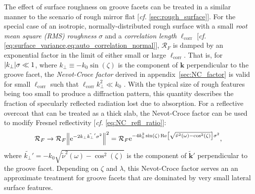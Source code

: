 The effect of surface roughness on groove facets can be treated in a similar manner to the scenario of rough mirror flat [\emph{cf.\@} \cref{sec:rough_surface}]. %
For the special case of an isotropic, normally-distributed rough surface with a small \emph{root mean square (RMS) roughness} $\sigma$ and a \emph{correlation length} $\ell_{\text{corr}}$ [\emph{cf.\@} \cref{eq:surface_variance,eq:auto_correlation_normal}], $\mathcal{R}_F$ is damped by an exponential factor in the limit of either small or large $\ell_{\text{corr}}$. 
That is, for $\abs{k_{\perp}} \sigma \ll 1$, where $k_{\perp} \equiv - k_0 \sin \left( \zeta \right)$ is the component of $\mathbold{k}$ perpendicular to the groove facet, the \emph{Nevot-Croce factor} derived in appendix~\ref{sec:NC_factor} is valid for small $\ell_{\text{corr}}$ such that $\ell_{\text{corr}} k_{\perp}^2 \ll k_0$ \cite{deBoer95}. 
With the typical size of rough features being too small to produce a diffraction pattern, this quantity describes the fraction of specularly reflected radiation lost due to absorption. %
For a reflective overcoat that can be treated as a thick slab, the Nevot-Croce factor can be used to modify Fresnel reflectivity [\emph{cf.\@} \cref{eq:NC_refl_ratio}]:
\begin{equation}
 \mathcal{R}_F \to \mathcal{R}_F \norm{\mathrm{e}^{- 2 k_{\perp} \tilde{k_{\perp}}' \sigma^2}}^2 = \mathcal{R}_F \mathrm{e}^{-4 k_0^2 \sin \left( \zeta \right) \Re \left[ \sqrt{\tilde{\nu}^2 (\omega) - \cos^2 \left( \zeta \right) } \right] \sigma^2} ,
 \end{equation}
where $\tilde{k_{\perp}}' = - k_0 \sqrt{\tilde{\nu}^2 (\omega) - \cos^2 \left( \zeta \right)}$ is the component of $\mathbold{\tilde{k}}'$ perpendicular to the groove facet. 
Depending on $\zeta$ and $\lambda$, this Nevot-Croce factor serves an an approximate treatment for groove facets that are dominated by very small lateral surface features. 

